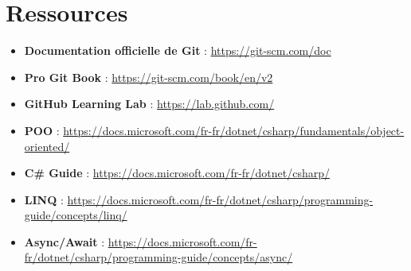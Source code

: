 \section*{Ressources}

\begin{itemize}
	\item \textbf{Documentation officielle de Git} : \url{https://git-scm.com/doc}
	\item \textbf{Pro Git Book} : \url{https://git-scm.com/book/en/v2}
	\item \textbf{GitHub Learning Lab} : \url{https://lab.github.com/}
	\item \textbf{POO} : \url{https://docs.microsoft.com/fr-fr/dotnet/csharp/fundamentals/object-oriented/}
	\item \textbf{C\# Guide} : \url{https://docs.microsoft.com/fr-fr/dotnet/csharp/}
	\item \textbf{LINQ} : \url{https://docs.microsoft.com/fr-fr/dotnet/csharp/programming-guide/concepts/linq/}
	\item \textbf{Async/Await} : \url{https://docs.microsoft.com/fr-fr/dotnet/csharp/programming-guide/concepts/async/}
\end{itemize}

